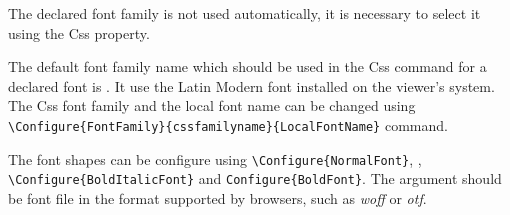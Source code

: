 

The declared font family is not used automatically, it is necessary to select
it using the  Css property.

The default font family name which should be used in the Css
 command for a declared font is . 
It use the Latin Modern font installed on the viewer's system. 
The Css font family and the local font name can be changed using
\verb|\Configure{FontFamily}{cssfamilyname}{LocalFontName}| command.

\begin{texsource}
\end{texsource}

The font shapes can be configure using \verb|\Configure{NormalFont}|, 
\texcommand{\Configure}\allowbreak{}, \verb|\Configure{BoldItalicFont}| and
\verb|Configure{BoldFont}|. The argument should be font file in the format
supported by browsers, such as \textit{woff} or \textit{otf}.


\begin{texsource}
\end{texsource}
